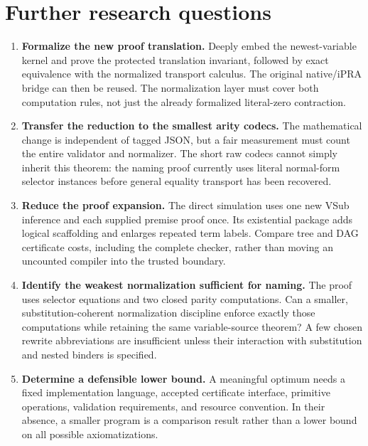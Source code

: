 \section{Further research questions}

\begin{enumerate}
\item \textbf{Formalize the new proof translation.}
Deeply embed the newest-variable kernel and prove the protected
translation invariant, followed by exact equivalence with the normalized
transport calculus. The original native/iPRA bridge can then be reused.
The normalization layer must cover both computation rules, not just the
already formalized literal-zero contraction.

\item \textbf{Transfer the reduction to the smallest arity codecs.}
The mathematical change is independent of tagged JSON, but a fair
measurement must count the entire validator and normalizer. The short
raw codecs cannot simply inherit this theorem: the naming proof currently
uses literal normal-form selector instances before general equality
transport has been recovered.

\item \textbf{Reduce the proof expansion.}
The direct simulation uses one new VSub inference and each supplied
premise proof once. Its existential package adds logical scaffolding
and enlarges repeated term labels. Compare tree and DAG certificate
costs, including the complete checker, rather than moving an uncounted
compiler into the trusted boundary.

\item \textbf{Identify the weakest normalization sufficient for naming.}
The proof uses selector equations and two closed parity computations.
Can a smaller, substitution-coherent normalization discipline enforce
exactly those computations while retaining the same variable-source
theorem? A few chosen rewrite abbreviations are insufficient unless
their interaction with substitution and nested binders is specified.

\item \textbf{Determine a defensible lower bound.}
A meaningful optimum needs a fixed implementation language, accepted
certificate interface, primitive operations, validation requirements,
and resource convention. In their absence, a smaller program is a
comparison result rather than a lower bound on all possible
axiomatizations.
\end{enumerate}

